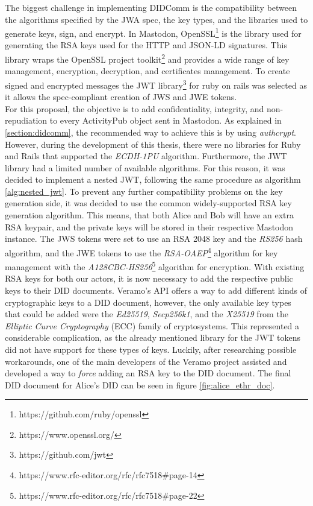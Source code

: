 The biggest challenge in implementing DIDComm is the compatibility between the algorithms specified by the JWA spec, the key types, and the libraries used to generate keys, sign, and encrypt. In Mastodon, OpenSSL\footnote{https://github.com/ruby/openssl} is the library used for generating the RSA keys used for the HTTP and JSON-LD signatures. This library wraps the OpenSSL project toolkit\footnote{https://www.openssl.org/} and provides a wide range of key management, encryption, decryption, and certificates management. To create signed and encrypted messages the JWT library\footnote{https://github.com/jwt} for ruby on rails was selected as it allows the spec-compliant creation of JWS and JWE tokens.\\
For this proposal, the objective is to add confidentiality, integrity, and non-repudiation to every ActivityPub object sent in Mastodon. As explained in \autoref{section:didcomm}, the recommended way to achieve this is by using \emph{authcrypt}. However, during the development of this thesis, there were no libraries for Ruby and Rails that supported the \emph{ECDH-1PU} algorithm. Furthermore, the JWT library had a limited number of available algorithms. For this reason, it was decided to implement a nested JWT, following the same procedure as algorithm \ref{alg:nested_jwt}. To prevent any further compatibility problems on the key generation side, it was decided to use the common widely-supported RSA key generation algorithm. This means, that both Alice and Bob will have an extra RSA keypair, and the private keys will be stored in their respective Mastodon instance. The JWS tokens were set to use an RSA 2048 key and the \emph{RS256} hash algorithm, and the JWE tokens to use the \emph{RSA-OAEP}\footnote{https://www.rfc-editor.org/rfc/rfc7518\#page-14} algorithm for key management with the \emph{A128CBC-HS256}\footnote{https://www.rfc-editor.org/rfc/rfc7518\#page-22} algorithm for encryption.
With existing RSA keys for both our actors, it is now necessary to add the respective public keys to their DID documents. Veramo's API offers a way to add different kinds of cryptographic keys to a DID document, however, the only available key types that could be added were the \emph{Ed25519}, \emph{Secp256k1}, and the  \emph{X25519} from the \emph{Elliptic Curve Cryptography} (ECC) family of cryptosystems. This represented a considerable complication, as the already mentioned library for the JWT tokens did not have support for these types of keys. Luckily, after researching possible workarounds, one of the main developers of the Veramo project assisted and developed a way to \emph{force} adding an RSA key to the DID document. The final DID document for Alice's DID can be seen in figure \ref{fig:alice_ethr_doc}.

